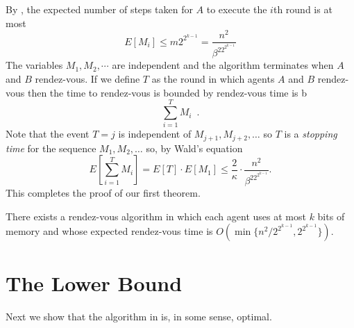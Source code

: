 \documentclass[lotsofwhite]{patmorin}
\begin{document}
By , the expected number of steps taken for $A$ to
execute the $i$th round is at most
\[
    E[M_i] \le m 2^{2^{k-1}} = \frac{n^2}{\beta^22^{2^{k-1}}}
\]
The variables $M_1,M_2,\cdots$ are independent and the algorithm
terminates when $A$ and $B$ rendez-vous.  If we define $T$ as
the round in which agents $A$ and $B$ rendez-vous then the time to
rendez-vous is bounded by
rendez-vous time is b
\[
   \sum_{i=1}^T M_i \enspace .
\]
Note that the event $T=j$ is independent of $M_{j+1},M_{j+2},\ldots$
so $T$ is a \emph{stopping time} \cite{mXX} for the sequence
$M_1,M_2,\ldots$ so, by Wald's equation
\[
   E\left[\sum_{i=1}^T M_i\right] = E[T]\cdot E[M_1] \le
\frac{2}{\kappa}\cdot \frac{n^2}{\beta^22^{2^{k-1}}}.
\]
This completes the proof of our first theorem.
\begin{thm}
There exists a rendez-vous algorithm in which each agent uses at most
$k$ bits of memory and whose expected rendez-vous time is
$O(\min\{n^2/2^{2^{k-1}},2^{2^{k-1}}\})$.
\end{thm}







\section{The Lower Bound}

Next we show that the algorithm in  is, in some
sense, optimal.
\end{document}
